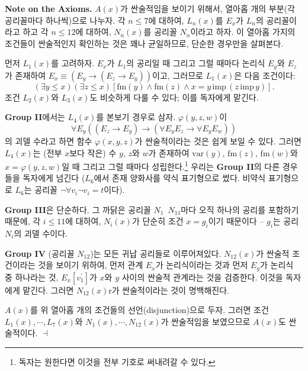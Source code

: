 \documentclass[12pt]{paper}
\newenvironment{context}[1][]
{ \noindent \textbf{{#1}.} }
{ \hfill $ \dashv $ }
\begin{document}
\begin{context}[Note on the Axioms]
$ A \left( x \right) $가 싼술적임을 보이기 위해서, 열아홉 개의 부분(각 공리꼴마다 하나씩)으로 나누자.
각 $ n \le 7 $에 대하여, $ L_{n} \left( x \right) $를 $E_{x}$가 $L_{n}$의 공리꼴이라고 하고
각 $n \le 12$에 대하여, $N_{n} \left( x \right) $를 공리꼴 $N_{n}$이라고 하자.
이 열아홉 가지의 조건들이 싼술적인지 확인하는 것은 꽤나 균일하므로, 단순한 경우만을 살펴본다.

먼저 $L_{1} \left( x \right)$를 고려하자. 
$E_{x}$가 $L_{1}$의 공리일 때 그리고 그럴 때마다 논리식 $E_{y}$와 $E_{z}$가 존재하여
$E_{x} \equiv \left( E_y \rightarrow \left( E_z \rightarrow E_y \right) \right)$이고,
그러므로 $L_1\left( x \right)$은 다음 조건이다:
$$ \left( \exists y \le x \right) \left( \exists z \le x \right) \left[ \mathrm{fm} \left( y \right) \land \mathrm{fm} \left( z \right) \land x = y \, \mathrm{imp} \, \left( z \, \mathrm{imp} \, y \right) \right] .$$
조건 $L_2\left( x \right)$와 $L_{3}\left( x \right)$도 비슷하게 다룰 수 있다; 이를 독자에게 맡긴다.

\textbf{Group II}에서는 $L_4 \left( x \right)$를 본보기 경우로 삼자.
$\varphi \left( y , z ,w \right)$이 $$\forall E_y \left(\left(E_z \rightarrow E_y\right) \rightarrow \left(\forall E_y E_z \rightarrow \forall E_y E_w \right)\right)$$의 괴델 수라고 하면
함수 $\varphi \left( x , y, z \right)$가 싼술적이라는 것은 쉽게 보일 수 있다.
그러면 $L_4 \left( x \right)$는 (전부 $x$보다 작은) 수 $y$, $z$와 $w$가 존재하여
$\mathrm{var} \left( y \right)$, $\mathrm{fm} \left( z \right)$, $\mathrm{fm} \left( w \right)$와 $x = \varphi \left( y , z , w \right)$일 때 그리고 그럴 때마다 성립한다.\footnote
{
독자는 원한다면 이것을 전부 기호로 써내려갈 수 있다.
}
우리는 \textbf{Group II}의 다른 경우들을 독자에게 넘긴다
($L_6$에서 존재 양화사를 약식 표기형으로 썼다. 비약식 표기형으로 $L_6$는 공리꼴 $\lnot \forall v_i \lnot v_i = t$이다).

\textbf{Group III}은 단순하다. 그 까닭은 공리꼴 $N_{1}$~$N_{11}$마다 오직 하나의 공리를 포함하기 때문에,
각 $i \le 11$에 대하여, $N_i \left( x \right)$가 단순히 조건 $x = g_i$이기 때문이다 -- $g_i$는 공리 $N_i$의 괴델 수이다.

\textbf{Group IV} (공리꼴 $N_{12}$)는 모든 귀납 공리들로 이루어져있다.
$N_{12} \left( x \right)$가 싼술적 조건이라는 것을 보이기 위하여, 먼저 관계 $E_x$가 논리식이라는 것과
먼저 $E_y$가 논리식 중 하나라는 것, $E_x \left[ v_1^{\prime} \right]$가 $x$와 $y$ 사이의 싼술적 관계라는 것을 검증한다.
이것을 독자에게 맡긴다. 그러면 $N_{12} \left( x \right)$r가 싼술적이라는 것이 명백해진다.

$A \left( x \right)$를 위 열아홉 개의 조건들의 선언(disjunction)으로 두자.
그러면 조건 $L_1 \left( x \right) , \cdots , L_7 \left( x \right)$와
$N_1 \left( x \right) , \cdots , N_{12} \left( x \right)$가 싼술적임을 보였으므로
$A \left( x \right)$도 싼술적이다.
\end{context}
\end{document}
